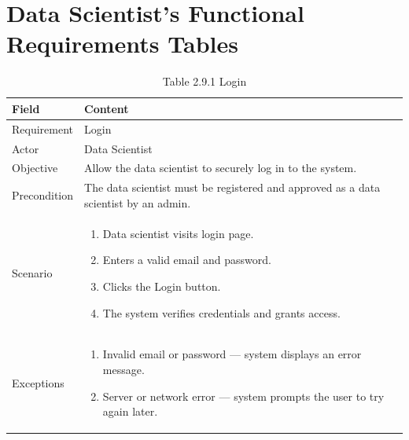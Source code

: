 \documentclass[12pt,oneside]{report}
\begin{document}
\section{Data Scientist’s Functional Requirements Tables}
\begin{table}[H]
\centering
\caption{Table 2.9.1 Login}
\label{tab:ds-login}
\begin{tabularx}{\textwidth}{|p{3cm}|X|}
\hline
\textbf{Field} & \textbf{Content} \\ \hline

Requirement & Login \\ \hline

Actor & Data Scientist \\ \hline

Objective & Allow the data scientist to securely log in to the system. \\ \hline

Precondition & The data scientist must be registered and approved as a data scientist by an admin. \\ \hline

Scenario & 
\begin{minipage}[t]{0.75\textwidth}
\begin{enumerate}[leftmargin=*,label=\arabic*.]
\item Data scientist visits login page.
\item Enters a valid email and password.
\item Clicks the Login button.
\item The system verifies credentials and grants access.
\end{enumerate}
\end{minipage} \\ \hline

Exceptions & 
\begin{minipage}[t]{0.75\textwidth}
\begin{enumerate}[leftmargin=*,label=\arabic*.]
\item Invalid email or password — system displays an error message.
\item Server or network error — system prompts the user to try again later.
\end{enumerate}
\end{minipage} \\ \hline

\end{tabularx}
\end{table}
\end{document}
